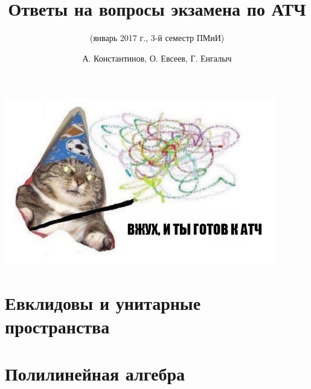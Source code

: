 \documentclass{scrartcl}
\title{Ответы на вопросы экзамена по АТЧ}
\subtitle{(январь 2017 г., 3-й семестр ПМиИ)}
\author{А. Константинов, О. Евсеев, Г. Енгалыч}
\begin{document}
    \thispagestyle{empty}
    \maketitle
    
    \begin{center}
        \vspace{120pt}
        \includegraphics[width=32em]{cat.png}
    \end{center}    

    \setcounter{part}{8}
    
    \part{Евклидовы и унитарные пространства}
    
    \part{Полилинейная алгебра}
\end{document}
